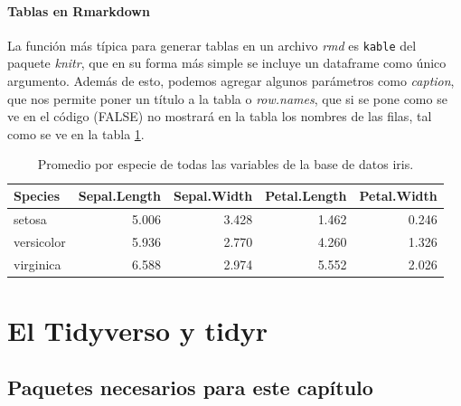 \documentclass[]{book}
\newenvironment{Shaded}{\begin{snugshade}}{\end{snugshade}}
\newcommand{\DataTypeTok}[1]{\textcolor[rgb]{0.13,0.29,0.53}{#1}}
\newcommand{\KeywordTok}[1]{\textcolor[rgb]{0.13,0.29,0.53}{\textbf{#1}}}
\newcommand{\NormalTok}[1]{#1}
\newcommand{\OperatorTok}[1]{\textcolor[rgb]{0.81,0.36,0.00}{\textbf{#1}}}
\newcommand{\OtherTok}[1]{\textcolor[rgb]{0.56,0.35,0.01}{#1}}
\newcommand{\StringTok}[1]{\textcolor[rgb]{0.31,0.60,0.02}{#1}}
\begin{document}
\hypertarget{tablas-en-rmarkdown}{%
\subsubsection{Tablas en Rmarkdown}\label{tablas-en-rmarkdown}}

La función más típica para generar tablas en un archivo \emph{rmd} es
\texttt{kable} del paquete \emph{knitr}, que en su forma más simple se
incluye un dataframe como único argumento. Además de esto, podemos
agregar algunos parámetros como \emph{caption}, que nos permite poner un
título a la tabla o \emph{row.names}, que si se pone como se ve en el
código (FALSE) no mostrará en la tabla los nombres de las filas, tal
como se ve en la tabla \ref{tab:SummaryMeans}.

\begin{Shaded}
\end{Shaded}

\begin{table}

\caption{\label{tab:SummaryMeans}Promedio por especie de todas las variables de la base de datos iris.}
\centering
\begin{tabular}[t]{lrrrr}
\toprule
Species & Sepal.Length & Sepal.Width & Petal.Length & Petal.Width\\
\midrule
setosa & 5.006 & 3.428 & 1.462 & 0.246\\
versicolor & 5.936 & 2.770 & 4.260 & 1.326\\
virginica & 6.588 & 2.974 & 5.552 & 2.026\\
\bottomrule
\end{tabular}
\end{table}

\hypertarget{tidyverso}{%
\chapter{El Tidyverso y tidyr}\label{tidyverso}}

\hypertarget{paquetes-necesarios-para-este-capitulo-2}{%
\section{Paquetes necesarios para este
capítulo}\label{paquetes-necesarios-para-este-capitulo-2}}
\end{document}
